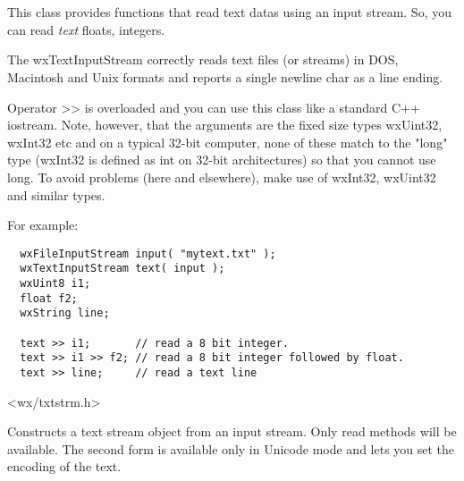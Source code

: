 \section{}\label{wxtextinputstream}

This class provides functions that read text datas using an input stream.
So, you can read {\it text} floats, integers.

The wxTextInputStream correctly reads text files (or streams) in DOS, Macintosh
and Unix formats and reports a single newline char as a line ending.

Operator >> is overloaded and you can use this class like a standard C++ iostream.
Note, however, that the arguments are the fixed size types wxUint32, wxInt32 etc
and on a typical 32-bit computer, none of these match to the "long" type (wxInt32
is defined as int on 32-bit architectures) so that you cannot use long. To avoid
problems (here and elsewhere), make use of wxInt32, wxUint32 and similar types.

For example:

\begin{verbatim}
  wxFileInputStream input( "mytext.txt" );
  wxTextInputStream text( input );
  wxUint8 i1;
  float f2;
  wxString line;

  text >> i1;       // read a 8 bit integer.
  text >> i1 >> f2; // read a 8 bit integer followed by float.
  text >> line;     // read a text line
\end{verbatim}


<wx/txtstrm.h>


\label{wxtextinputstreamconstr}



Constructs a text stream object from an input stream. Only read methods will
be available. The second form is available only in Unicode mode and lets
you set the encoding of the text.


